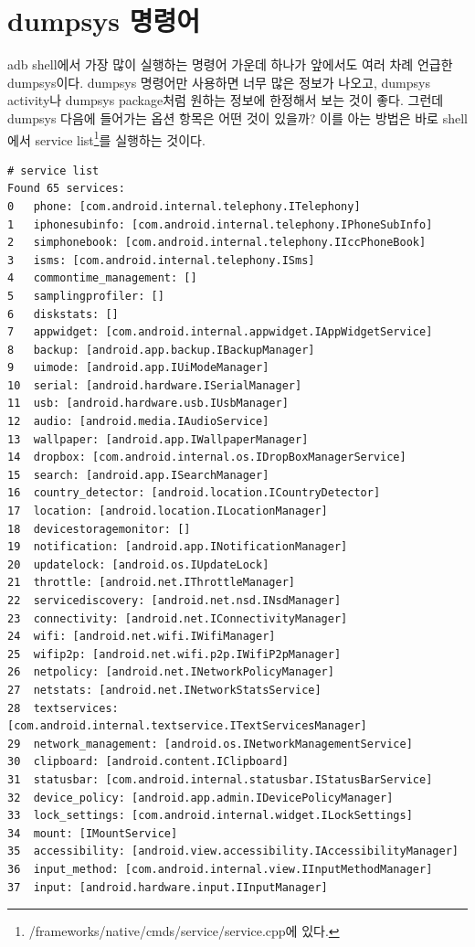 \section{dumpsys 명령어}\label{sec:dumpsys}
adb shell에서 가장 많이 실행하는 명령어 가운데 하나가 앞에서도 여러 차례 언급한 dumpsys이다. 
dumpsys 명령어만 사용하면 너무 많은 정보가 나오고, dumpsys activity나 dumpsys package처럼 원하는 정보에 한정해서 보는 것이 좋다.
그런데 dumpsys 다음에 들어가는 옵션 항목은 어떤 것이 있을까? 이를 아는 방법은 바로 shell에서 service list\footnote{/frameworks/native/cmds/service/service.cpp에 있다.}를 실행하는 것이다.
\begin{lstlisting}[frame=single] 
# service list
Found 65 services:
0	phone: [com.android.internal.telephony.ITelephony]
1	iphonesubinfo: [com.android.internal.telephony.IPhoneSubInfo]
2	simphonebook: [com.android.internal.telephony.IIccPhoneBook]
3	isms: [com.android.internal.telephony.ISms]
4	commontime_management: []
5	samplingprofiler: []
6	diskstats: []
7	appwidget: [com.android.internal.appwidget.IAppWidgetService]
8	backup: [android.app.backup.IBackupManager]
9	uimode: [android.app.IUiModeManager]
10	serial: [android.hardware.ISerialManager]
11	usb: [android.hardware.usb.IUsbManager]
12	audio: [android.media.IAudioService]
13	wallpaper: [android.app.IWallpaperManager]
14	dropbox: [com.android.internal.os.IDropBoxManagerService]
15	search: [android.app.ISearchManager]
16	country_detector: [android.location.ICountryDetector]
17	location: [android.location.ILocationManager]
18	devicestoragemonitor: []
19	notification: [android.app.INotificationManager]
20	updatelock: [android.os.IUpdateLock]
21	throttle: [android.net.IThrottleManager]
22	servicediscovery: [android.net.nsd.INsdManager]
23	connectivity: [android.net.IConnectivityManager]
24	wifi: [android.net.wifi.IWifiManager]
25	wifip2p: [android.net.wifi.p2p.IWifiP2pManager]
26	netpolicy: [android.net.INetworkPolicyManager]
27	netstats: [android.net.INetworkStatsService]
28	textservices: [com.android.internal.textservice.ITextServicesManager]
29	network_management: [android.os.INetworkManagementService]
30	clipboard: [android.content.IClipboard]
31	statusbar: [com.android.internal.statusbar.IStatusBarService]
32	device_policy: [android.app.admin.IDevicePolicyManager]
33	lock_settings: [com.android.internal.widget.ILockSettings]
34	mount: [IMountService]
35	accessibility: [android.view.accessibility.IAccessibilityManager]
36	input_method: [com.android.internal.view.IInputMethodManager]
37	input: [android.hardware.input.IInputManager]

\end{lstlisting}
